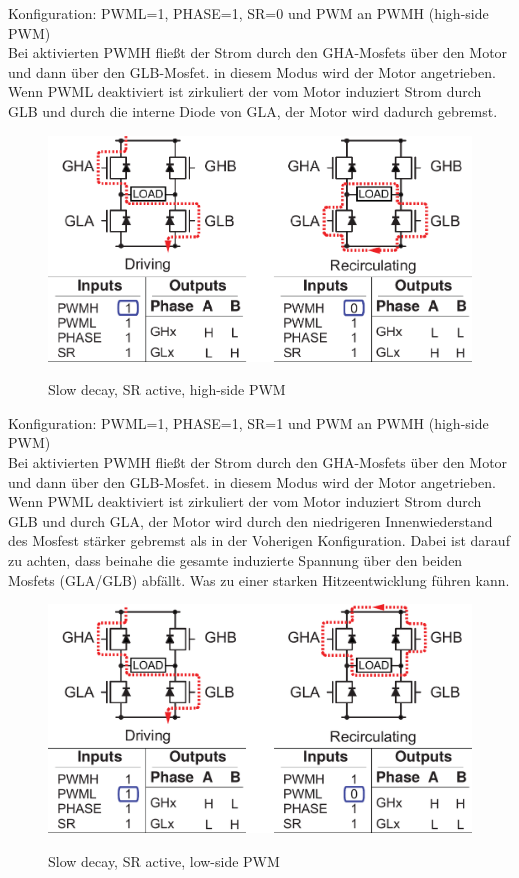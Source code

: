 Konfiguration: PWML=1, PHASE=1, SR=0 und PWM an PWMH (high-side PWM)\\
Bei aktivierten PWMH fließt der Strom durch den GHA-Mosfets über den Motor und
dann über den GLB-Mosfet. in diesem Modus wird der Motor angetrieben.
Wenn PWML deaktiviert ist zirkuliert der vom Motor induziert Strom durch GLB und durch
die interne Diode von GLA, der Motor wird dadurch gebremst.


\begin{figure}[H]
\centering
\includegraphics[width=.8\textwidth]{3941_2.png}\\
\caption{Slow decay, SR active, high-side PWM}%
\label{fig:3941_2}
\end{figure}

Konfiguration: PWML=1, PHASE=1, SR=1 und PWM an PWMH (high-side PWM)\\
Bei aktivierten PWMH fließt der Strom durch den GHA-Mosfets über den Motor und
dann über den GLB-Mosfet. in diesem Modus wird der Motor angetrieben.
Wenn PWML deaktiviert ist zirkuliert der vom Motor induziert Strom durch 
GLB und durch GLA, der Motor wird durch den niedrigeren Innenwiederstand des Mosfest 
stärker gebremst als in der Voherigen Konfiguration. Dabei ist darauf zu achten, dass
beinahe die gesamte induzierte Spannung über den beiden Mosfets (GLA/GLB) abfällt.
Was zu einer starken Hitzeentwicklung führen kann.



\begin{figure}[H]
\centering
\includegraphics[width=.8\textwidth]{3941_3.png}\\
\caption{Slow decay, SR active, low-side PWM}%
\label{fig:3941_3}
\end{figure}

